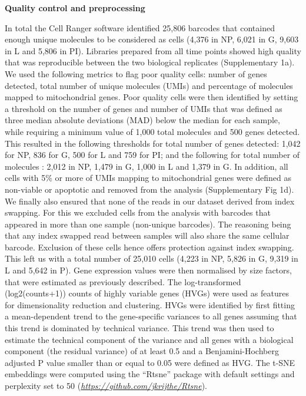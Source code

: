 \documentclass[titlepage, 12pt, oneside]{amsart}
\begin{document}
\textbf{Quality control and preprocessing}

In total the Cell Ranger software identified 25,806 barcodes that contained enough unique molecules to be considered as cells (4,376 in NP, 6,021 in G, 9,603 in L and 5,806 in PI).
Libraries prepared from all time points showed high quality that was reproducible between the two biological replicates (Supplementary 1a).
We used the following metrics to flag poor quality cells: number of genes detected, total number of unique molecules (UMIs) and percentage of molecules mapped to mitochondrial genes.
Poor quality cells were then identified by setting a threshold on the number of genes and number of UMIs that was defined as three median absolute deviations (MAD) below the median for each sample, while requiring a minimum value of 1,000 total molecules and 500 genes detected.  
This resulted in the following thresholds for total number of genes detected: 1,042 for NP, 836 for G, 500 for L and 759 for PI; and the following for total number of molecules : 2,012 in NP, 1,479 in G, 1,000 in L and 1,379 in G.
In addition, all cells with 5\% or more of UMIs mapping to mitochondrial genes were defined as non-viable or apoptotic and removed from the analysis (Supplementary Fig 1d).
We finally also ensured that none of the reads in our dataset derived from index swapping\autocite{Sinha2017}.
For this we excluded cells from the analysis with barcodes that appeared in more than one sample (non-unique barcodes).
The reasoning being that any index swapped read between samples will also share the same cellular barcode.
Exclusion of these cells hence offers protection against index swapping.
This left us with a total number of 25,010 cells (4,223 in NP, 5,826 in G, 9,319 in L and 5,642 in P).
Gene expression values were then normalised by size factors, that were estimated as previously described\autocite{Lun2016}.
The log-transformed (log2(counts+1)) counts of highly variable genes (HVGs) were used as features for dimensionality reduction and clustering.
HVGs were identified by first fitting a mean-dependent trend to the gene-specific variances to all genes assuming that this trend is dominated by technical variance.
This trend was then used to estimate the technical component of the variance and all genes with a biological component (the residual variance) of at least 0.5 and a Benjamini-Hochberg adjusted P value smaller than or equal to 0.05 were defined as HVG.
The t-SNE embeddings were computed using the ``Rtsne'' package with default settings and perplexity set to 50 (\href{https://github.com/jkrijthe/Rtsne}{\textit{https://github.com/jkrijthe/Rtsne}}).
\end{document}
